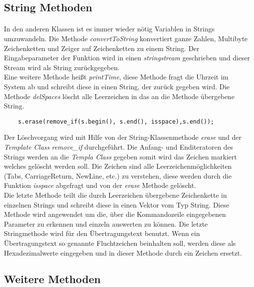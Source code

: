   
\subsection{String Methoden}
\paragraph{}
In den anderen Klassen ist es immer wieder nötig Variablen in Strings umzuwandeln. Die Methode \textit{convertToString} konvertiert ganze Zahlen, Multibyte Zeichenketten und Zeiger auf Zeichenketten zu einem String. Der Eingabeparameter der Funktion wird in einen \textit{stringstream} geschrieben und dieser Stream wird als String zurückgegeben.\\

Eine weitere Methode heißt \textit{printTime}, diese Methode fragt die Uhrzeit im System ab und schreibt diese in einen String, der zurück gegeben wird. Die Methode \textit{delSpaces} löscht alle Leerzeichen in das an die Methode übergebene String. 

\begin{lstlisting}
	s.erase(remove_if(s.begin(), s.end(), isspace),s.end());
\end{lstlisting}

Der Löschvorgang wird mit Hilfe von der String-Klassenmethode \textit{erase} und der \textit{Template Class} \textit{remove\_if} durchgeführt. Die Anfang- und Enditeratoren des Strings werden an die \textit{Templa Class} gegeben somit wird das Zeichen markiert welches gelöscht werden soll. Die Zeichen sind alle Leerzeichenmöglichkeiten (Tabs, CarriageReturn, NewLine, etc.) zu verstehen, diese werden durch die Funktion \textit{isspace} abgefragt und von der \textit{erase} Methode gelöscht.\\

Die letzte Methode teilt die durch Leerzeichen übergebene Zeichenkette in einzelnen Strings und schreibt diese in einen Vektor vom Typ String. Diese Methode wird angewendet um die, über die Kommandozeile eingegebenen Parameter zu erkennen und einzeln auswerten zu können. Die letzte Stringmethode wird für den Übertragungstext benutzt. Wenn ein Übertragungstext so genannte Fluchtzeichen beinhalten soll, werden diese als Hexadezimalwerte eingegeben und in dieser Methode durch ein Zeichen ersetzt.

\subsection{Weitere Methoden}
